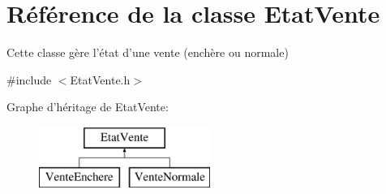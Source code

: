 \hypertarget{class_etat_vente}{\section{Référence de la classe Etat\-Vente}
\label{class_etat_vente}
}


Cette classe gère l'état d'une vente (enchère ou normale)  




{\ttfamily \#include $<$Etat\-Vente.\-h$>$}

Graphe d'héritage de Etat\-Vente\-:\begin{figure}[H]
\begin{center}
\leavevmode
\includegraphics[height=2.000000cm]{class_etat_vente}
\end{center}
\end{figure}
